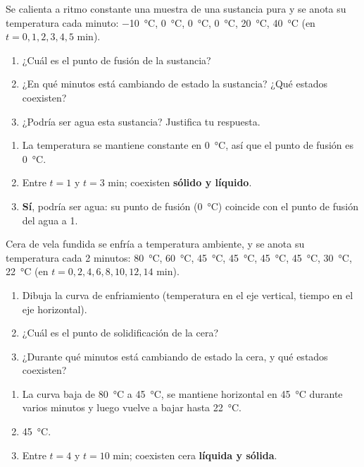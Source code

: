 \begin{exercise}
    Se calienta a ritmo constante una muestra de una sustancia pura y se anota su temperatura cada minuto: \qty{-10}{\celsius}, \qty{0}{\celsius}, \qty{0}{\celsius}, \qty{0}{\celsius}, \qty{20}{\celsius}, \qty{40}{\celsius} (en \(t = 0, 1, 2, 3, 4, 5\) min).
    \begin{enumerate}[label=\letraminuscula]
        \item ¿Cuál es el punto de fusión de la sustancia?
        \item ¿En qué minutos está cambiando de estado la sustancia? ¿Qué estados coexisten?
        \item ¿Podría ser agua esta sustancia? Justifica tu respuesta.
    \end{enumerate}
    \begin{solu}
        \begin{enumerate}[label=\alph*)]
            \item La temperatura se mantiene constante en \qty{0}{\celsius}, así que el punto de fusión es \qty{0}{\celsius}.
            \item Entre \(t = 1\) y \(t = 3\) min; coexisten \textbf{sólido y líquido}.
            \item \textbf{Sí}, podría ser agua: su punto de fusión (\qty{0}{\celsius}) coincide con el punto de fusión del agua a \qty{1}{\atmospher}.
        \end{enumerate}
    \end{solu}
\end{exercise}

\begin{exercise}
    Cera de vela fundida se enfría a temperatura ambiente, y se anota su temperatura cada 2 minutos: \qty{80}{\celsius}, \qty{60}{\celsius}, \qty{45}{\celsius}, \qty{45}{\celsius}, \qty{45}{\celsius}, \qty{45}{\celsius}, \qty{30}{\celsius}, \qty{22}{\celsius} (en \(t = 0, 2, 4, 6, 8, 10, 12, 14\) min).
    \begin{enumerate}[label=\letraminuscula]
        \item Dibuja la curva de enfriamiento (temperatura en el eje vertical, tiempo en el eje horizontal).
        \item ¿Cuál es el punto de solidificación de la cera?
        \item ¿Durante qué minutos está cambiando de estado la cera, y qué estados coexisten?
    \end{enumerate}
    \begin{solu}
        \begin{enumerate}[label=\alph*)]
            \item La curva baja de \qty{80}{\celsius} a \qty{45}{\celsius}, se mantiene horizontal en \qty{45}{\celsius} durante varios minutos y luego vuelve a bajar hasta \qty{22}{\celsius}.
            \item \qty{45}{\celsius}.
            \item Entre \(t = 4\) y \(t = 10\) min; coexisten cera \textbf{líquida y sólida}.
        \end{enumerate}
    \end{solu}
\end{exercise}

